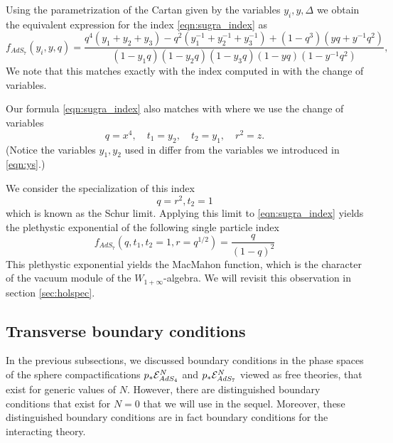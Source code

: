 \documentclass[../main.tex]{subfiles}
\begin{document}
Using the parametrization of the Cartan given by the variables $y_i, y,\Delta$ we obtain the equivalent expression for the index \eqref{eqn:sugra_index} as 
\begin{equation}
\label{eqn:Kim_sugra}
f_{AdS_7} (y_i, y, q) = \frac{q^4(y_1+y_2+y_3)-q^2(y_1^{-1} + y_2^{-1} + y_3^{-1})+(1-q^3)(yq + y^{-1} q^2)}{(1-y_1 q)(1-y_2 q)(1-y_3 q)(1-yq)(1-y^{-1} q^2)},
\end{equation}
We note that this matches exactly with the index computed in \cite[equation (3.23)]{Kim:2013nva} with the change of variables.

Our formula \eqref{eqn:sugra_index} also matches with \cite[equation (3.24)]{Bhattacharya:2008zy} where we use the change of variables
\begin{equation}
q = x^4, \quad t_1 = y_2, \quad t_2 = y_1, \quad r^2 = z .
\end{equation}
(Notice the variables $y_1,y_2$ used in \cite{Bhattacharya:2008zy} differ from the variables we introduced in \eqref{eqn:ys}.)

\parsec \label{eqn:winfty}
We consider the specialization of this index 
\begin{equation}
q=r^2, t_2=1 
\end{equation}
which is known as the Schur limit.
Applying this limit to \eqref{eqn:sugra_index} yields the plethystic exponential of the following single particle index
\[
f_{AdS_7}(q, t_1, t_2=1, r = q^{1/2}) = \frac{q}{(1-q)^2} 
\]
This plethystic exponential yields the MacMahon function, which is the character of the vacuum module of the $W_{1+\infty}$-algebra. We will revisit this observation in section \ref{sec:holspec}.

\subsection{Transverse boundary conditions}\label{sec:transversebc}

In the previous subsections, we discussed boundary conditions in the phase spaces of the sphere compactifications $p_* \mathcal{E}^N_{AdS_4}$ and $p_* \mathcal{E}^N_{AdS_7}$ viewed as free theories, that exist for generic values of $N$. However, there are distinguished boundary conditions that exist for $N = 0$ that we will use in the sequel. Moreover, these distinguished boundary conditions are in fact boundary conditions for the interacting theory. 
\end{document}
